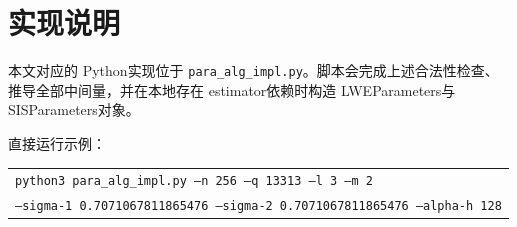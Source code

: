 \documentclass[11pt]{article}
\newcommand{\zh}[1]{{\zhfont #1}}
\begin{document}
\section*{\zh{实现说明}}
{\zhfont 本文对应的 }Python{\zhfont 实现位于 \texttt{para\_alg\_impl.py}。脚本会完成上述合法性检查、推导全部中间量，并在本地存在 }estimator{\zhfont 依赖时构造 }LWEParameters{\zhfont 与 }SISParameters{\zhfont 对象。}

{\zhfont 直接运行示例：}\par
{\small
\begin{tabular}{@{}l@{}}
\texttt{python3 para\_alg\_impl.py --n 256 --q 13313 --l 3 --m 2}\\
\texttt{--sigma-1 0.7071067811865476 --sigma-2 0.7071067811865476 --alpha-h 128}
\end{tabular}
}
\end{document}
